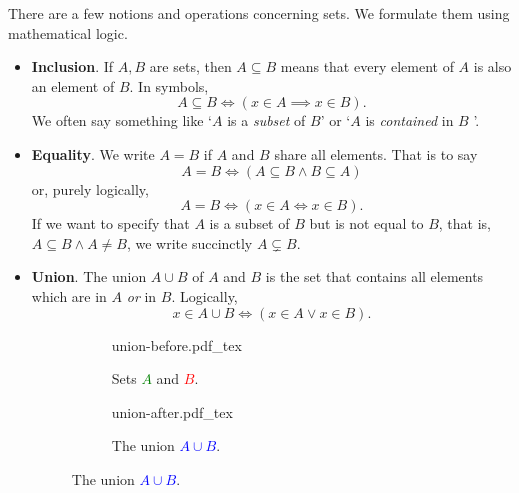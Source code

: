 \documentclass[a4paper,11pt]{article}
\begin{document}
 There are a few notions and operations concerning sets. We formulate them
 using mathematical logic.
 \begin{itemize} 
  \item \textbf{Inclusion}. If $A,B$ are sets, then $A \subseteq B$ means that
   every element of $A$ is also an element of $B$. In symbols,
   \[
    A \subseteq B \iff (x \in A \implies x \in B).
   \]
  We often say something like `$A$ is a \emph{subset} of $B$' or `$A$ is
   \emph{contained} in $B$ '.
  \item \textbf{Equality}. We write $A = B$ if $A$ and $B$ share all elements.
   That is to say
   \[
    A = B \iff (A \subseteq B \wedge B \subseteq A)
   \]
   or, purely logically,
   \[
    A = B \iff (x \in A \iff x \in B).
   \]
   If we want to specify that $A$ is a subset of $B$ but is not equal to $B$,
   that is, $A \subseteq B \wedge A \neq B$, we write succinctly $A \subsetneq
   B$.
  \item \textbf{Union}. The union $A \cup B$ of $A$ and $B$ is the set that
   contains all elements which are in $A$ \emph{or} in $B$. Logically,
   \[
    x \in A \cup B \iff (x \in A \vee x \in B).
   \]
   \begin{figure}[h]
    \centering
    \begin{subfigure}{.45\textwidth}
     \centering
     \def\svgwidth{.7\textwidth}
     {union-before.pdf_tex}
     \caption*{Sets \textcolor{green}{$A$} and \textcolor{red}{$B$}.}
    \end{subfigure}
    \begin{subfigure}{.45\textwidth}
     \centering
     \def\svgwidth{.7\textwidth}
     {union-after.pdf_tex}
     \caption*{The union \textcolor{blue}{$A \cup B$}.}
    \end{subfigure}
   \end{figure}
 \end{itemize}
\end{document}
